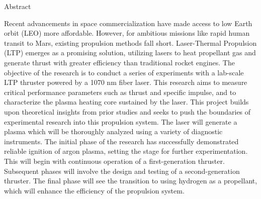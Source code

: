 \begin{plainchp}{Abstract}

    Recent advancements in space commercialization have made access to low Earth orbit (LEO) more affordable. However, for ambitious missions like rapid human transit to Mars, existing propulsion methods fall short. Laser-Thermal Propulsion (LTP) emerges as a promising solution, utilizing lasers to heat propellant gas and generate thrust with greater efficiency than traditional rocket engines. The objective of the research is to conduct a series of experiments with a lab-scale LTP thruster powered by a 1070 nm fiber laser. This research aims to measure critical performance parameters such as thrust and specific impulse, and to characterize the plasma heating core sustained by the laser. This project builds upon theoretical insights from prior studies and seeks to push the boundaries of experimental research into this propulsion system. The laser will generate a plasma which will be thoroughly analyzed using a variety of diagnostic instruments. The initial phase of the research has successfully demonstrated reliable ignition of argon plasma, setting the stage for further experimentation. This will begin with continuous operation of a first-generation thruster. Subsequent phases will involve the design and testing of a second-generation thruster. The final phase will see the transition to using hydrogen as a propellant, which will enhance the efficiency of the propulsion system.

\end{plainchp}